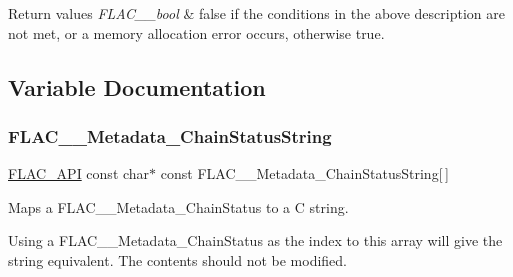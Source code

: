 \begin{DoxyRetVals}{Return values}
{\em F\+L\+A\+C\+\_\+\+\_\+bool} & {\ttfamily false} if the conditions in the above description are not met, or a memory allocation error occurs, otherwise {\ttfamily true}. \\
\hline
\end{DoxyRetVals}


\subsection{Variable Documentation}
\mbox{\label{group__flac__metadata__level2_gabb4646b4af36d17497676759767f8cc7}} 
\subsubsection{\texorpdfstring{FLAC\_\_Metadata\_ChainStatusString}{FLAC\_\_Metadata\_ChainStatusString}}
{\footnotesize\ttfamily \mbox{\hyperlink{group__flac__export_ga56ca07df8a23310707732b1c0007d6f5}{F\+L\+A\+C\+\_\+\+A\+PI}} const char$\ast$ const F\+L\+A\+C\+\_\+\+\_\+\+Metadata\+\_\+\+Chain\+Status\+String\mbox{[}$\,$\mbox{]}}

Maps a F\+L\+A\+C\+\_\+\+\_\+\+Metadata\+\_\+\+Chain\+Status to a C string.

Using a F\+L\+A\+C\+\_\+\+\_\+\+Metadata\+\_\+\+Chain\+Status as the index to this array will give the string equivalent. The contents should not be modified. 